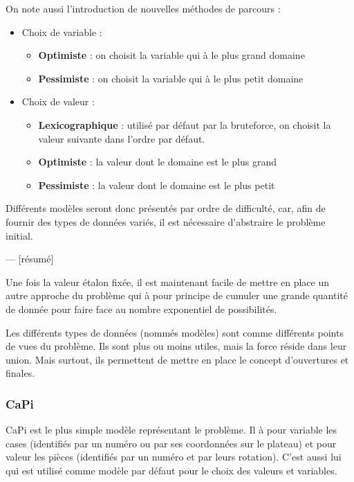 	On note aussi l'introduction de nouvelles méthodes de parcours :
	
	\begin{itemize}
		\item Choix de variable :
		\begin{itemize}
			\item\textbf{Optimiste} : on choisit la variable qui à le plus grand domaine
			\item\textbf{Pessimiste} : on choisit la variable qui à le plus petit domaine
		\end{itemize}
		\item Choix de valeur :
		\begin{itemize}
			\item \textbf{Lexicographique} : utilisé par défaut par la bruteforce, on choisit la valeur suivante dans l'ordre par défaut.
			\item \textbf{Optimiste} : la valeur dont le domaine est le plus grand
			\item \textbf{Pessimiste} : la valeur dont le domaine est le plus petit
		\end{itemize}
	\end{itemize}
	
	Différents modèles seront donc présentés par ordre de difficulté, car, afin de fournir des types de données variés, il est nécessaire d'abstraire le problème initial.
	
--- [résumé]

	Une fois la valeur étalon fixée, il est maintenant facile de mettre en place un autre approche du problème qui à pour principe de cumuler une grande quantité de donnée pour faire face au nombre exponentiel de possibilités.

	Les différents types de données (nommés modèles) sont comme différents points de vues du problème. Ils sont plus ou moins utiles, mais la force réside dans leur union. Mais surtout, ils permettent de mettre en place le concept d'ouvertures et finales.

	\subsubsection{CaPi}

	CaPi est le plus simple modèle représentant le problème. Il à pour variable les cases (identifiés par un numéro ou par ses coordonnées sur le plateau) et pour valeur les pièces (identifiés par un numéro et par leurs rotation). C'est aussi lui qui est utilisé comme modèle par défaut pour le choix des valeurs et variables.
	
